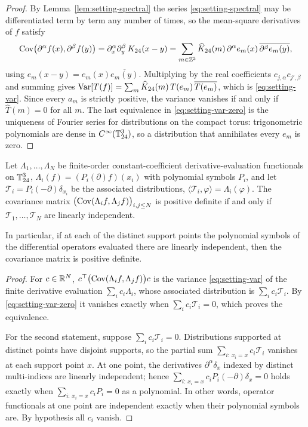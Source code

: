 \begin{proof}
By Lemma~\ref{lem:setting-spectral} the series \eqref{eq:setting-spectral} may be differentiated term by term any number of times, so the mean-square derivatives of $f$ satisfy
\[
\operatorname{Cov}\bigl(\partial^\alpha f(x),\partial^\beta f(y)\bigr)=\partial_x^\alpha\partial_y^\beta\,K_{24}(x-y)=\sum_{m\in\mathbb Z^3}\widehat K_{24}(m)\,\partial^\alpha e_m(x)\,\overline{\partial^\beta e_m(y)} ,
\]
using $e_m(x-y)=e_m(x)\overline{e_m(y)}$. Multiplying by the real coefficients $c_{j,\alpha}c_{j',\beta}$ and summing gives $\operatorname{Var}[T(f)]=\sum_m\widehat K_{24}(m)\,T(e_m)\,\overline{T(e_m)}$, which is \eqref{eq:setting-var}. Since every $a_m$ is strictly positive, the variance vanishes if and only if $\widehat T(m)=0$ for all $m$. The last equivalence in \eqref{eq:setting-var-zero} is the uniqueness of Fourier series for distributions on the compact torus: trigonometric polynomials are dense in $C^\infty(\mathbb T^3_{24})$, so a distribution that annihilates every $e_m$ is zero.
\end{proof}

\begin{theorem}\label{thm:setting-gram}
Let $\Lambda_1,\dots,\Lambda_N$ be finite-order constant-coefficient derivative-evaluation functionals on $\mathbb T^3_{24}$, $\Lambda_i(f)=(P_i(\partial)f)(x_i)$ with polynomial symbols $P_i$, and let $\mathcal T_i=P_i(-\partial)\delta_{x_i}$ be the associated distributions, $\langle\mathcal T_i,\varphi\rangle=\Lambda_i(\varphi)$. The covariance matrix $\bigl(\operatorname{Cov}(\Lambda_if,\Lambda_jf)\bigr)_{i,j\le N}$ is positive definite if and only if $\mathcal T_1,\dots,\mathcal T_N$ are linearly independent.

In particular, if at each of the distinct support points the polynomial symbols of the differential operators evaluated there are linearly independent, then the covariance matrix is positive definite.
\end{theorem}

\begin{proof}
For $c\in\mathbb R^N$, $c^{\top}\bigl(\operatorname{Cov}(\Lambda_if,\Lambda_jf)\bigr)c$ is the variance \eqref{eq:setting-var} of the finite derivative evaluation $\sum_ic_i\Lambda_i$, whose associated distribution is $\sum_ic_i\mathcal T_i$. By \eqref{eq:setting-var-zero} it vanishes exactly when $\sum_ic_i\mathcal T_i=0$, which proves the equivalence.

For the second statement, suppose $\sum_ic_i\mathcal T_i=0$. Distributions supported at distinct points have disjoint supports, so the partial sum $\sum_{i:\,x_i=x}c_i\mathcal T_i$ vanishes at each support point $x$. At one point, the derivatives $\partial^\alpha\delta_x$ indexed by distinct multi-indices are linearly independent; hence $\sum_{i:\,x_i=x}c_iP_i(-\partial)\delta_x=0$ holds exactly when $\sum_{i:\,x_i=x}c_iP_i=0$ as a polynomial. In other words, operator functionals at one point are independent exactly when their polynomial symbols are. By hypothesis all $c_i$ vanish.
\end{proof}

